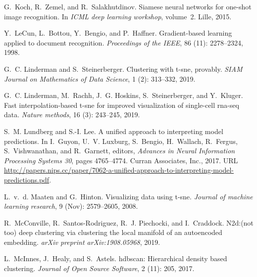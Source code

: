 \documentclass{article}
\begin{document}
\begin{thebibliography}{30}
G.~Koch, R.~Zemel, and R.~Salakhutdinov.
\newblock Siamese neural networks for one-shot image recognition.
\newblock In \emph{ICML deep learning workshop}, volume~2. Lille, 2015.

Y.~LeCun, L.~Bottou, Y.~Bengio, and P.~Haffner.
\newblock Gradient-based learning applied to document recognition.
\newblock \emph{Proceedings of the IEEE}, 86 (11):
  2278--2324, 1998.

G.~C. Linderman and S.~Steinerberger.
\newblock Clustering with t-sne, provably.
\newblock \emph{SIAM Journal on Mathematics of Data Science}, 1
  (2): 313--332, 2019.

G.~C. Linderman, M.~Rachh, J.~G. Hoskins, S.~Steinerberger, and Y.~Kluger.
\newblock Fast interpolation-based t-sne for improved visualization of
  single-cell rna-seq data.
\newblock \emph{Nature methods}, 16 (3): 243--245, 2019.

S.~M. Lundberg and S.-I. Lee.
\newblock A unified approach to interpreting model predictions.
\newblock In I.~Guyon, U.~V. Luxburg, S.~Bengio, H.~Wallach, R.~Fergus,
  S.~Vishwanathan, and R.~Garnett, editors, \emph{Advances in Neural
  Information Processing Systems 30}, pages 4765--4774. Curran Associates,
  Inc., 2017.
\newblock URL
  \url{http://papers.nips.cc/paper/7062-a-unified-approach-to-interpreting-model-predictions.pdf}.

L.~v.~d. Maaten and G.~Hinton.
\newblock Visualizing data using t-sne.
\newblock \emph{Journal of machine learning research}, 9
  (Nov): 2579--2605, 2008.

R.~McConville, R.~Santos-Rodriguez, R.~J. Piechocki, and I.~Craddock.
\newblock N2d:(not too) deep clustering via clustering the local manifold of an
  autoencoded embedding.
\newblock \emph{arXiv preprint arXiv:1908.05968}, 2019.

L.~McInnes, J.~Healy, and S.~Astels.
\newblock hdbscan: Hierarchical density based clustering.
\newblock \emph{Journal of Open Source Software}, 2 (11):
  205, 2017.


\end{thebibliography}
\end{document}
